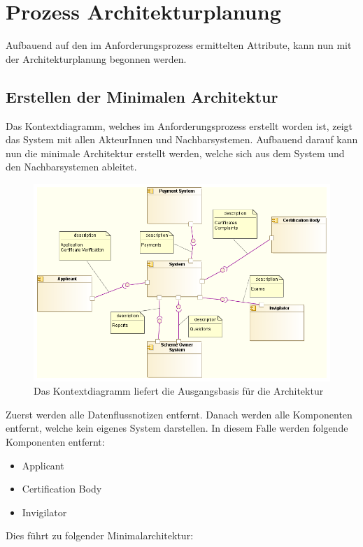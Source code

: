 \chapter{Prozess Architekturplanung}
Aufbauend auf den im Anforderungsprozess ermittelten Attribute, kann nun mit der Architekturplanung begonnen werden.

\section{Erstellen der Minimalen Architektur}
Das Kontextdiagramm, welches im Anforderungsprozess erstellt worden ist, zeigt das System mit allen AkteurInnen und Nachbarsystemen. Aufbauend darauf kann nun die minimale Architektur erstellt werden, welche sich aus dem System und den Nachbarsystemen ableitet.

\begin{figure}[H]
    \centering
    \includegraphics[scale=0.5]{uml/context.png}
    \caption{Das Kontextdiagramm liefert die Ausgangsbasis für die Architektur}
\end{figure}

Zuerst werden alle Datenflussnotizen entfernt. Danach werden alle Komponenten entfernt, welche kein eigenes System darstellen. In diesem Falle werden folgende Komponenten entfernt:

\begin{itemize}
  \item Applicant
  \item Certification Body
  \item Invigilator
\end{itemize}

Dies führt zu folgender Minimalarchitektur:

